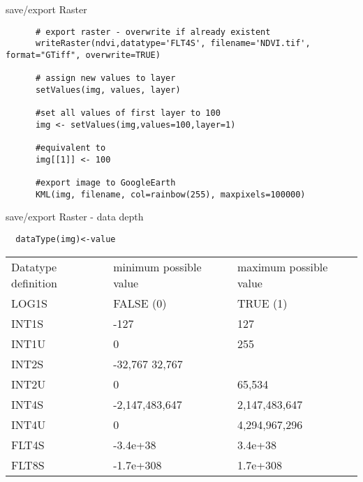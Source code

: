 \begin{frame}[fragile]{save/export Raster }

   \begin{lstlisting}
	  # export raster - overwrite if already existent
	  writeRaster(ndvi,datatype='FLT4S', filename='NDVI.tif', format="GTiff", overwrite=TRUE)
	  
	  # assign new values to layer
	  setValues(img, values, layer)
	  
	  #set all values of first layer to 100
	  img <- setValues(img,values=100,layer=1)
	  
	  #equivalent to
	  img[[1]] <- 100
	  
	  #export image to GoogleEarth
	  KML(img, filename, col=rainbow(255), maxpixels=100000) 

   \end{lstlisting}

\end{frame}


\begin{frame}[fragile]{save/export Raster - data depth}
 \begin{lstlisting}
  dataType(img)<-value
 \end{lstlisting}

\begin{tiny}
\begin{tabular}{lll}

	Datatype definition  &minimum possible value  &maximum possible value  \\
	LOG1S  &FALSE (0)&TRUE (1)  \\
	INT1S  &-127  &127  \\
	INT1U  &0  &255  \\
	INT2S  &-32,767	32,767  \\
	INT2U  &0  &65,534  \\
	INT4S  &-2,147,483,647  &2,147,483,647  \\
	INT4U  &0  &4,294,967,296  \\
	FLT4S  &-3.4e+38  &3.4e+38  \\
	FLT8S  &-1.7e+308  &1.7e+308 \\
  
\end{tabular}
\end{tiny} 
\end{frame}



